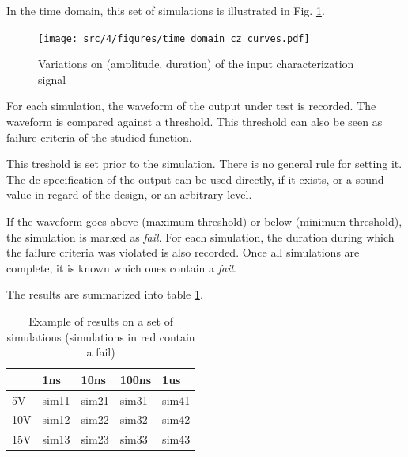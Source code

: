 In the time domain, this set of simulations is illustrated in Fig. \ref{set_input_signals}.

\begin{figure}[!htbp]
  \centering
  \texttt{[image: src/4/figures/time\_domain\_cz\_curves.pdf]}
  \caption{Variations on (amplitude, duration) of the input characterization signal}
  \label{set_input_signals}
\end{figure}

For each simulation, the waveform of the output under test is recorded.
The waveform is compared against a threshold.
This threshold can also be seen as failure criteria of the studied function.

This treshold is set prior to the simulation.
There is no general rule for setting it.
The \gls{dc} specification of the output can be used directly, if it exists, or a sound value in regard of the design, or an arbitrary level.

If the waveform goes above (maximum threshold) or below (minimum threshold), the simulation is marked as \textit{fail}.
For each simulation, the duration during which the failure criteria was violated is also recorded.
Once all simulations are complete, it is known which ones contain a \textit{fail}.

The results are summarized into table \ref{simulation-results}.

\begin{table}[!htbp]
\centering
\begin{tabular}{@{}lllll@{}}
\toprule
    & 1ns                          & 10ns                         & 100ns                        & 1us                          \\ \midrule
5V  & {\color[HTML]{32CB00} sim11} & {\color[HTML]{32CB00} sim21} & {\color[HTML]{32CB00} sim31} & {\color[HTML]{FE0000} sim41} \\
10V & {\color[HTML]{32CB00} sim12} & {\color[HTML]{FE0000} sim22} & {\color[HTML]{FE0000} sim32} & {\color[HTML]{FE0000} sim42} \\
15V & {\color[HTML]{FE0000} sim13} & {\color[HTML]{FE0000} sim23} & {\color[HTML]{FE0000} sim33} & {\color[HTML]{FE0000} sim43} \\ \bottomrule
\end{tabular}
\caption{Example of results on a set of simulations (simulations in red contain a fail)}
\label{simulation-results}
\end{table}

